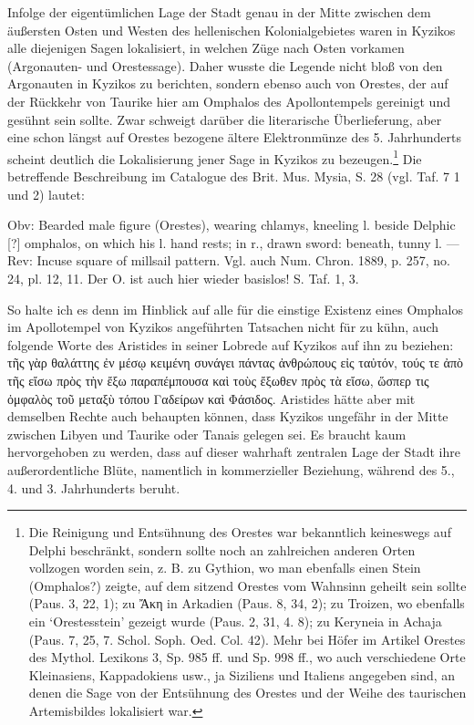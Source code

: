 \documentclass[a4paper, 11pt, oneside]{article}
\begin{document}
Infolge der eigentümlichen Lage der Stadt genau in der Mitte zwischen dem äußersten Osten und Westen des hellenischen Kolonialgebietes waren in Kyzikos alle diejenigen Sagen lokalisiert, in welchen Züge nach Osten vorkamen (Argonauten- und Orestessage). Daher wusste die Legende nicht bloß von den Argonauten in Kyzikos zu berichten, sondern ebenso auch von Orestes, der auf der Rückkehr von Taurike hier am Omphalos des Apollontempels gereinigt und gesühnt sein sollte. Zwar schweigt darüber die literarische Überlieferung, aber eine schon längst auf Orestes bezogene ältere Elektronmünze des 5. Jahrhunderts scheint deutlich die Lokalisierung jener Sage in Kyzikos zu bezeugen.\footnote{Die Reinigung und Entsühnung des Orestes war bekanntlich keineswegs auf Delphi beschränkt, sondern sollte noch an zahlreichen anderen Orten vollzogen worden sein, z. B. zu Gythion, wo man ebenfalls einen Stein (Omphalos?) zeigte, auf dem sitzend Orestes vom Wahnsinn geheilt sein sollte (Paus. 3, 22, 1); zu Ἄκη in Arkadien (Paus. 8, 34, 2); zu Troizen, wo ebenfalls ein `Orestesstein' gezeigt wurde (Paus. 2, 31, 4. 8); zu Keryneia in Achaja (Paus. 7, 25, 7. Schol. Soph. Oed. Col. 42). Mehr bei Höfer im Artikel Orestes des Mythol. Lexikons 3, Sp. 985 ff. und Sp. 998 ff., wo auch verschiedene Orte Kleinasiens, Kappadokiens usw., ja Siziliens und Italiens angegeben sind, an denen die Sage von der Entsühnung des Orestes und der Weihe des taurischen Artemisbildes lokalisiert war.} Die betreffende Beschreibung im Catalogue des Brit. Mus. Mysia, S. 28 (vgl. Taf. 7 1 und 2) lautet:

Obv: Bearded male figure (Orestes), wearing chlamys, kneeling l. beside Delphic [?] omphalos, on which his l. hand rests; in r., drawn sword: beneath, tunny l. --- Rev: Incuse square of millsail pattern. Vgl. auch Num. Chron. 1889, p. 257, no. 24, pl. 12, 11. Der O. ist auch hier wieder basislos! S. Taf. 1, 3.

So halte ich es denn im Hinblick auf alle für die einstige Existenz eines Omphalos im Apollotempel von Kyzikos angeführten Tatsachen nicht für zu kühn, auch folgende Worte des Aristides in seiner Lobrede auf Kyzikos auf ihn zu beziehen: τῆς γὰρ θαλάττης ἐν μέσῳ κειμένη συνάγει πάντας ἀνθρώπους εἰς ταὐτόν, τούς τε ἀπὸ τῆς εἴσω πρὸς τὴν ἔξω παραπέμπουσα καὶ τοὺς ἔξωθεν πρὸς τὰ εἴσω, ὥσπερ τις ὀμφαλὸς τοῦ μεταξὺ τόπου Γαδείρων καὶ Φάσιδος. Aristides hätte aber mit demselben Rechte auch behaupten können, dass Kyzikos ungefähr in der Mitte zwischen Libyen und Taurike oder Tanais gelegen sei. Es braucht kaum hervorgehoben zu werden, dass auf dieser wahrhaft zentralen Lage der Stadt ihre außerordentliche Blüte, namentlich in kommerzieller Beziehung, während des 5., 4. und 3. Jahrhunderts beruht.
\end{document}
